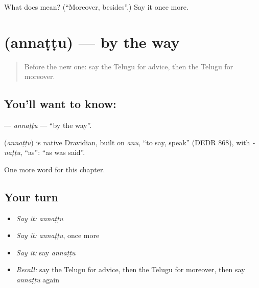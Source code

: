 \begin{tcolorbox}[breakable,colback=teal!4,colframe=teal!35!black,title={Before you move on}]
What does  mean? (\textquotedblleft{}Moreover, besides\textquotedblright{}.) Say it once more.
\end{tcolorbox}
\section[\texorpdfstring{\te{అన్నట్టు} (annaṭṭu)}{అన్నట్టు (annaṭṭu)}]{ (annaṭṭu) — by the way}

\label{lesson:TE-C294-annattu}



\begin{quote}
Before the new one: say the Telugu for advice, then the Telugu for moreover.
\end{quote}

\subsection*{You'll want to know: }
\textbf{} — \emph{annaṭṭu} — \textquotedblleft{}by the way\textquotedblright{}.

\begin{cousinweb}
\textbf{} (\emph{annaṭṭu}) is native Dravidian, built on \emph{anu}, \textquotedblleft{}to say, speak\textquotedblright{} (DEDR 868), with \emph{-naṭṭu}, \textquotedblleft{}as\textquotedblright{}: \textquotedblleft{}as was said\textquotedblright{}.
\end{cousinweb}

\begin{grammarlens}[title={What you've built}]
One more word for this chapter.
\end{grammarlens}

\subsection*{Your turn}
\begin{itemize}
\raggedright
  \item \emph{Say it:} \emph{annaṭṭu}
  \item \emph{Say it:} \emph{annaṭṭu}, once more
  \item \emph{Say it:} say \emph{annaṭṭu}
  \item \emph{Recall:} say the Telugu for advice, then the Telugu for moreover, then say \emph{annaṭṭu} again
\end{itemize}

